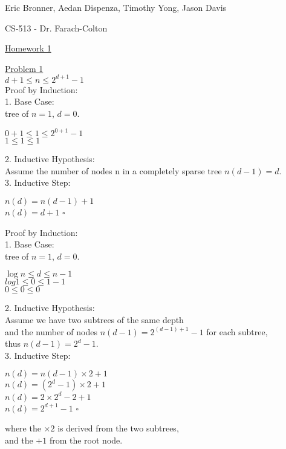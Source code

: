 \documentclass[a4paper,12pt]{article}
\begin{document}
\pagestyle{headings}

\centerline{Eric Bronner, Aedan Dispenza, Timothy Yong, Jason Davis}
\centerline{CS-513 - Dr. Farach-Colton}
\centerline{\underline{Homework 1}}

\underline{Problem 1}\\
\indent $d+1 \leq n \leq 2^{d+1} -  1$\\
\indent Proof by Induction:\\

1. Base Case:\\
\indent \indent tree of $n =1$, $d = 0$.
\begin{center}
$0 + 1 \leq 1 \leq 2^{0+1} - 1$\\
$1 \leq 1 \leq 1$\\
\end{center}

2. Inductive Hypothesis:\\
\indent \indent Assume the number of nodes n in a completely sparse tree $n(d-1) = d$.\\

3. Inductive Step:
\begin{center}
$n(d) = n(d-1)+ 1$\\
$n(d) = d + 1$ $\square$\\
\end{center}

Proof by Induction:\\

1. Base Case:\\
\indent \indent tree of $n = 1$, $d = 0$.
\begin{center}
$\log{n} \leq d \leq n-1$ \\
$log{1} \leq 0 \leq 1-1$\\
$0 \leq 0 \leq 0$\\
\end{center}

2. Inductive Hypothesis: \\
\indent \indent Assume we have two subtrees of the same depth\\ 
\indent \indent and the number of nodes $n(d-1) = 2^{(d-1)+1} -1$ for each subtree, \\
\indent \indent thus $n(d-1) = 2^d -1$.\\

3. Inductive Step: 
\begin{center}
$n(d) = n(d-1) \times 2 + 1$ \\ 
$n(d) = (2^d-1) \times 2 + 1$\\
$n(d) = 2\times2^d - 2 + 1$\\
$n(d) = 2^{d +1} - 1$ $\square$\\
\end{center}
\indent \indent where the $\times 2$ is derived from the two subtrees, \\
\indent and the $+1$ from the root node.\\
\end{document}
